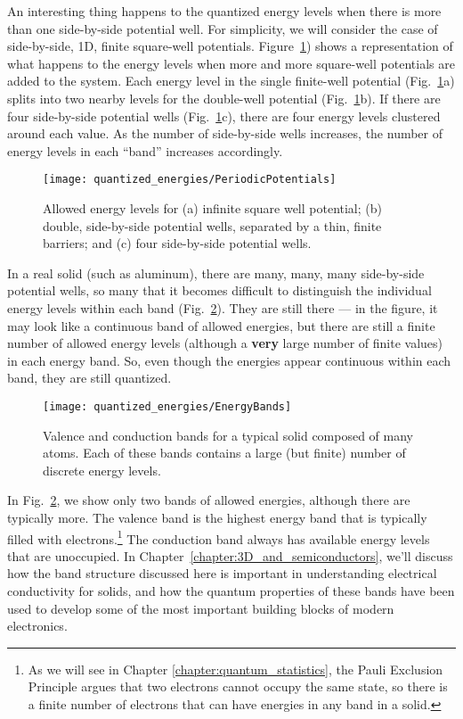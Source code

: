 An interesting thing happens to the quantized energy levels when there
is more than one side-by-side potential well. For simplicity, we will
consider the case of side-by-side, 1D, finite square-well potentials.
Figure~\ref{fig:PeriodicPotentials}) shows a representation of what
happens to the energy levels when more and more square-well potentials are
added to the system. Each energy level in the single finite-well potential
(Fig.~\ref{fig:PeriodicPotentials}a) splits into two nearby levels for the
double-well potential (Fig.~\ref{fig:PeriodicPotentials}b).  If there are
four side-by-side potential wells (Fig.~\ref{fig:PeriodicPotentials}c),
there are four energy levels clustered around each value. As the number
of side-by-side wells increases, the number of energy levels in each
``band'' increases accordingly.

\begin{figure}[!t]
\begin{center}
\texttt{[image: quantized\_energies/PeriodicPotentials]}
\end{center}
\caption{Allowed energy levels for (a) infinite square well potential;
(b) double, side-by-side potential wells, separated by a thin, finite
barriers; and (c) four side-by-side potential wells.}
\label{fig:PeriodicPotentials}
\end{figure}

In a real solid (such as aluminum), there are many, many, many side-by-side
potential wells, so many that it becomes difficult to distinguish the
individual energy levels within each band (Fig.~\ref{fig:bands}). They
are still there --- in the figure, it may look like a continuous band of
allowed energies, but there are still a finite number of allowed
energy levels (although a {\bf very} large number of finite values)
in each energy band. So, even though the energies appear continuous
within each band, they are still quantized.

\begin{figure}[!t]
\begin{center}
\texttt{[image: quantized\_energies/EnergyBands]}
\end{center}
\caption{Valence and conduction bands for a typical solid composed of
many atoms. Each of these bands contains a large (but finite) number of
discrete energy levels.}
\label{fig:bands}
\end{figure}

In Fig.~\ref{fig:bands}, we show only two bands of allowed energies,
although there are typically more. The valence band is the highest
energy band that is typically filled with electrons.\footnote{As we will
see in Chapter \ref{chapter:quantum_statistics}, the Pauli Exclusion
Principle argues that two electrons cannot occupy the same state,
so there is a finite number of electrons that can have energies in any
band in a solid.} The conduction band always has available energy levels
that are unoccupied.  In Chapter~\ref{chapter:3D_and_semiconductors},
we'll discuss how the band structure discussed here is important in
understanding electrical conductivity for solids, and how the quantum
properties of these bands have been used to develop some of the most
important building blocks of modern electronics.

